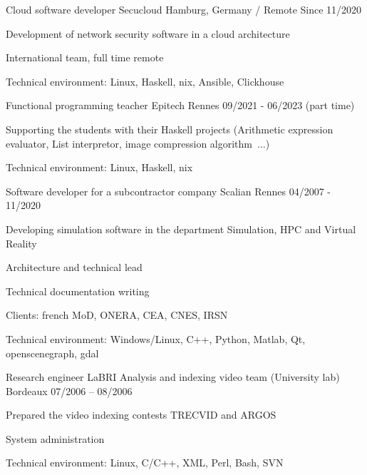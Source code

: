 \begin{cventries}
  \cventry
    {Cloud software developer}
    {Secucloud}
    {Hamburg, Germany / Remote}
    {Since 11/2020}
    {
      \begin{cvitems}
        \item {Development of network security software in a cloud architecture}
        \item {International team, full time remote}
        \item {Technical environment: Linux, Haskell, nix, Ansible, Clickhouse}
      \end{cvitems}
    }

  \cventry
    {Functional programming teacher}
    {Epitech}
    {Rennes}
    {09/2021 - 06/2023 (part time)}
    {
      \begin{cvitems}
          \item {Supporting the students with their Haskell projects
              (Arithmetic expression evaluator, List interpretor, image
              compression algorithm~...)}
          \item {Technical environment: Linux, Haskell, nix}
      \end{cvitems}
    }

  \cventry
    {Software developer for a subcontractor company}
    {Scalian}
    {Rennes}
    {04/2007 - 11/2020}
    {
      \begin{cvitems}
        \item {Developing simulation software in the department Simulation, HPC
            and Virtual Reality}
        \item {Architecture and technical lead}
        \item {Technical documentation writing}
        \item {Clients: french MoD, ONERA, CEA, CNES, IRSN}
        \item {Technical environment: Windows/Linux, C++, Python, Matlab, Qt,
            openscenegraph, gdal}
      \end{cvitems}
    }

  \cventry
    {Research engineer}
    {LaBRI Analysis and indexing video team (University lab)}
    {Bordeaux}
    {07/2006 – 08/2006}
    {
      \begin{cvitems}
        \item {Prepared the video indexing contests TRECVID and ARGOS}
        \item {System administration}
        \item {Technical environment: Linux, C/C++, XML, Perl, Bash, SVN}
      \end{cvitems}
    }


\end{cventries}
